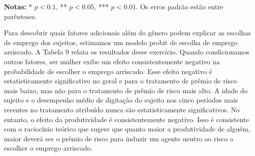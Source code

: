 \documentclass[a4paper,12pt]{article}[abntex2]
\begin{document}
\begin{table}[h!]
\centering
\caption{Equação de Seleção Probit para 'Emprego Arriscado'.}
\textbf{Notas:} * \( p < 0.1 \), ** \( p < 0.05 \), *** \( p < 0.01 \). Os erros padrão estão entre parênteses.
\end{table}

Para descobrir quais fatores adicionais além do gênero podem explicar as escolhas de emprego dos sujeitos, estimamos um modelo probit de escolha de emprego arriscado. A Tabela 9 relata os resultados desse exercício. Quando condicionamos outros fatores, ser mulher exibe um efeito consistentemente negativo na probabilidade de escolher o emprego arriscado. Esse efeito negativo é estatisticamente significativo no geral e para o tratamento de prêmio de risco mais baixo, mas não para o tratamento de prêmio de risco mais alto. A idade do sujeito e o desempenho médio de digitação do sujeito nos cinco períodos mais recentes no tratamento atribuído nunca são estatisticamente significativos. No entanto, o efeito da produtividade é consistentemente negativo. Isso é consistente com o raciocínio teórico que sugere que quanto maior a produtividade de alguém, maior deverá ser o prêmio de risco para induzir um agente neutro ao risco a escolher o emprego arriscado.
\end{document}
